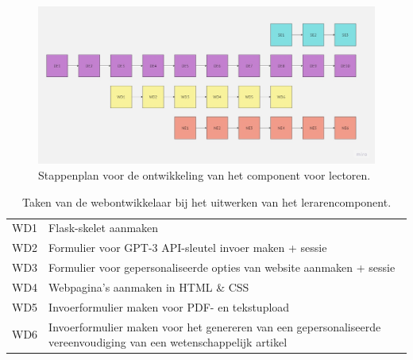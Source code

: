 \begin{figure}[H]
	\includegraphics[width=\linewidth]{img/flowchart-development.jpg}
	\caption{Stappenplan voor de ontwikkeling van het component voor lectoren.}
	\label{img:stappenplan-leerkrachten}
\end{figure}

\begin{center}
	\begin{table}
		\begin{tabular}{ | m{2cm} | m{12cm} | } 
			\hline
			WD1 & Flask-skelet aanmaken \\
			WD2 & Formulier voor GPT-3 API-sleutel invoer maken + sessie \\
			WD3 & Formulier voor gepersonaliseerde opties van website aanmaken + sessie \\
			WD4 & Webpagina's aanmaken in HTML \& CSS \\
			WD5 & Invoerformulier maken voor PDF- en tekstupload \\
			WD6 & Invoerformulier maken voor het genereren van een gepersonaliseerde vereenvoudiging van een wetenschappelijk artikel \\
			\hline
		\end{tabular}
		\label{table:tasks-web-engineer}
		\caption{Taken van de webontwikkelaar bij het uitwerken van het lerarencomponent.}
	\end{table}
\end{center}

